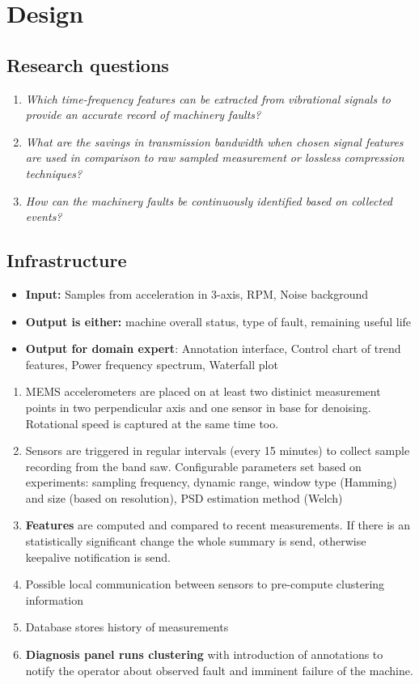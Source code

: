\chapter{Design}

\section{Research questions}
\begin{enumerate}
\item \emph{Which time-frequency features can be extracted from vibrational signals to provide an accurate record of machinery faults?}
\item \emph{What are the savings in transmission bandwidth when chosen signal features are used in comparison to raw sampled measurement or lossless compression techniques?}
\item \emph{How can the machinery faults be continuously identified based on collected events?}
\end{enumerate}

\section{Infrastructure}
 \begin{itemize}
\item \textbf{Input:} Samples from acceleration in 3-axis, RPM, Noise background
\item \textbf{Output is either:} machine overall status, type of fault, remaining useful life
\item \textbf{Output for domain expert}: Annotation interface, Control chart of trend features, Power frequency spectrum, Waterfall plot
 \end{itemize}

\begin{enumerate}
\item MEMS accelerometers are placed on at least two distinict measurement points in two perpendicular axis and one sensor in base for denoising. Rotational speed is captured at the same time too. 
\item Sensors are triggered in regular intervals (every 15 minutes) to collect sample recording from the band saw. Configurable parameters set based on experiments: sampling frequency, dynamic range, window type (Hamming) and size (based on resolution), PSD estimation method (Welch)
\item \textbf{Features} are computed and compared to recent measurements. If there is an statistically significant change the whole summary is send, otherwise keepalive notification is send.
\item Possible local communication between sensors to pre-compute clustering information
\item Database stores history of measurements
\item \textbf{Diagnosis panel runs clustering} with introduction of annotations to notify the operator about observed fault and imminent failure of the machine.
\end{enumerate}

